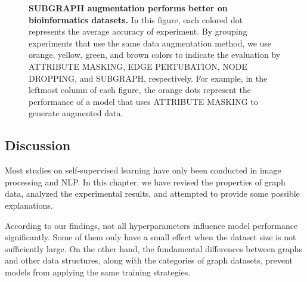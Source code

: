 \begin{figure}
\vspace{0.5cm}
\caption[SUBGRAPH augmentation performs better on bioinformatics datasets]{\textbf{SUBGRAPH augmentation performs better on bioinformatics datasets.} In this figure, each colored dot represents the average accuracy of experiment. By grouping experiments that use the same data augmentation method, we use orange, yellow, green, and brown colors to indicate the evaluation by ATTRIBUTE MASKING, EDGE PERTUBATION, NODE DROPPING, and SUBGRAPH, respectively. For example, in the leftmost column of each figure, the orange dots represent the performance of a model that uses ATTRIBUTE MASKING to generate augmented data.}
\label{fig:stable}
\end{figure}




\subsection{Discussion}

Most studies on self-supervised learning have only been conducted in image processing and NLP. In this chapter, we have revised the properties of graph data, analyzed the experimental results, and attempted to provide some possible explanations. 

According to our findings, not all hyperparameters influence model performance significantly. Some of them only have a small effect when the dataset size is not sufficiently large. On the other hand, the fundamental differences between graphs and other data structures, along with the categories of graph datasets, prevent models from applying the same training strategies.